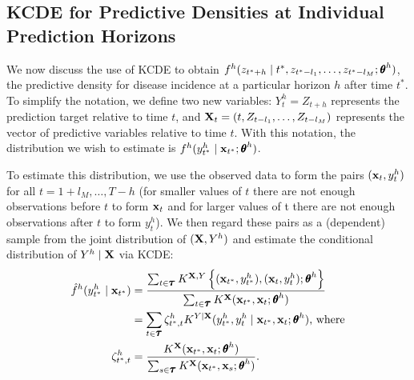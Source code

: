 \documentclass[times, doublespace]{simauth}\usepackage[]{graphicx}\usepackage[]{color}
\begin{document}
\subsection{KCDE for Predictive Densities at Individual Prediction Horizons}
\label{subsec:Methods:KCDE}

We now discuss the use of KCDE to obtain $f^{h}(z_{t^* + h} \mid t^*, z_{t^* -
l_1}, \ldots, z_{t^* - l_M}; \btheta^h)$, the predictive density for disease
incidence at a particular horizon $h$ after time $t^*$.  To simplify the
notation, we define two new variables: $Y_t^{h} = Z_{t + h}$ represents the
prediction target relative to time $t$, and ${\bf X}_t = (t, Z_{t - l_1}, \ldots,
Z_{t - l_M})$ represents the vector of predictive variables relative to time
$t$.  With this notation, the distribution we wish to estimate is
$f^{h}(y_{t^*}^{h} \mid \bx_{t^*}; \btheta^h)$.

To estimate this distribution, we use the observed data to form the
pairs $({\bf x}_t, y_t^{h})$ for all $t = 1 + l_M, \ldots, T - h$
(for smaller values of $t$ there are not enough observations before $t$ to form
${\bf x}_t$ and for larger values of t there are not enough observations after $t$ to form
$y_t^{h}$).  We then regard these pairs as a (dependent) sample from the joint
distribution of $({\bf X}, Y^h)$ and estimate the conditional distribution of $Y^h \mid {\bf X}$ via KCDE:
\begin{align}
\hat{f}^h(y^h_{t^*} \mid \bx_{t^*}) &= \frac{\sum_{t \in \btau} K^{\bX, Y}\left\{(\bx_{t^*}, y^h_{t^*}), (\bx_t, y^h_t); \btheta^h \right\}}{\sum_{t \in \btau}K^{\bX}(\bx_{t^*}, \bx_t ; \btheta^h)} \label{eqn:KCDEDefinition} \\
\quad &= \sum_{t \in \btau} \zeta^h_{t^*, t} K^{Y \mid \bX}(y^h_{t^*}, y^h_t \mid \bx_{t^*}, \bx_t; \btheta^h) \text{, where} \label{eqn:KDEwt} \\
\zeta^h_{t^*, t} &= \frac{ K^{\bX}(\bx_{t^*}, \bx_t; \btheta^h) }{\sum_{s \in \btau} K^{\bX}(\bx_{t^*}, \bx_{s}; \btheta^h) }. \label{eqn:KCDEWeightsDef}
\end{align}

\end{document}
